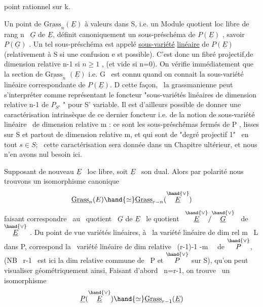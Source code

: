 
point rationnel sur k.

Un point de $\underline{\mathrm{Grass}}_n(\underline{E})$ à valeurs dans S, i.e. un Module quotient
loc libre de rang n \ $\underline{G}$ de $\underline{E}$, définit canoniquement un sous-préschéma
de $P(\underline{E})$ , savoir $P(\underline{G})$ . Un tel sous-préschéma est appelé \uline{sous-variété}
\uline{linéaire} de $P(\underline{E})$ (relativement à S si une confusion e st possible).
C'est donc un fibré projectif,de dimension relative n-1 si $n\geqslant 1$ ,
(et vide si n=0). On vérifie immédiatement que la section de $\underline{\mathrm{Grass}}_n$
$(\underline{E})$ i.e. G \ est connu quand on connait la sous-variété linéaire
correspondante de $P(\underline{E})$. D cette façon, \ la grassmanienne peut
s'interpréter comme représentant le foncteur "sous-variétés linéaires
de dimension relative n-1  de $P_{S'}$ " pour S'
variable. Il est d'ailleurs possible de donner une caractérisation
intrinsèque de ce dernier foncteur i.e. de la notion de sous-variété
linéaire \ de dimension relative m : ce sont les sous-préschémas fermés
de P , lisses sur S et partout de dimension relative m, et qui sont
de "degré projectif 1" \ en tout $s\in S$; \ cette caractérisation sera
donnée dans un Chapitre ultérieur, et nous n'en avons nul besoin ici.

Supposant de nouveau $\underline{E}$ \ loc libre, soit $\underline{E}$ \ son dual. Alors
par polarité nous trouvons un isomorphisme canonique
\[ \underline{\mathrm{Grass}}_n(E) \hand{\simeq} \underline{\mathrm{Grass}}_{r-n}(\overset{\hand{\vee}}{\underline{E}}) \]
faisant correspondre \ au \ quotient \ $\underline{G}$ de $\underline{E}$ \ le quotient \ $\overset{\hand{\vee}}{\underline{E}}/\overset{\hand{\vee}}{\underline{G}}$ \ de $\overset{\hand{\vee}}{\underline{E}}$ .
Du point de vue variétés linéaires, à \ la variété linéaire de dim rel
m \ L dans P, correspond la \ variété linéaire de dim relative
 \ (r-1)-1 -m \ \ de $\overset{\hand{\vee}}{P}$, (NB \ r-1 \ est ici la dim relative
commune de \ P et $\overset{\hand{\vee}}{P}$ sur S), qu'on peut visualiser géométriquement ainsi,
Faisant d'abord \ n=r-1, on trouve \ un isomorphisme
\[ \underline{P}(\overset{\hand{\vee}}{\underline{E}}) \hand{\simeq} \underline{\mathrm{Grass}}_{r-1}(\underline{E}) \]

